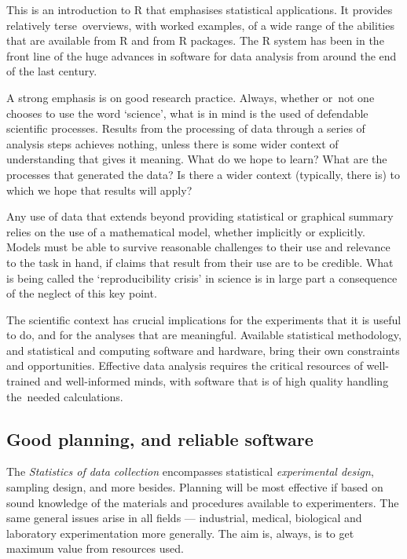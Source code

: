 

\begin{fullwidth}
This is an introduction to R that emphasises statistical applications.
It provides relatively terse overviews, with worked examples, of a
wide range of the abilities that are available from R and from R
packages.  The R system has been in the front line of the huge
advances in software for data analysis from around the end of the
last century.

A strong emphasis is on good research practice.  Always, whether
or not one chooses to use the word `science', what is in mind is
the used of defendable scientific processes.  Results from the
processing of data through a series of analysis steps achieves
nothing, unless there is some wider context of understanding that
gives it meaning.  What do we hope to learn?  What are the processes
that generated the data?  Is there a wider context (typically, there
is) to which we hope that results will apply?

Any use of data that extends beyond providing statistical or
graphical summary relies on the use of a mathematical model,
whether implicitly or explicitly.  Models must be able to
survive reasonable challenges to their use and relevance to
the task in hand, if claims that result from their use are
to be credible.  What is being called the `reproducibility
crisis' in science is in large part a consequence of the neglect
of this key point.

The scientific context has crucial implications for the experiments
that it is useful to do, and for the analyses that are meaningful.
Available statistical methodology, and statistical and computing
software and hardware, bring their own constraints and opportunities.
Effective data analysis requires the critical resources of
well-trained and well-informed minds, with software that is of high 
quality handling the needed calculations.

\subsection*{Good planning, and reliable software}

The \textit{Statistics of data collection}  encompasses statistical
\textit{experimental design}, sampling design, and more besides.
Planning will be most effective if based on sound knowledge of the
materials and procedures available to experimenters.
The same general issues arise in all fields --- industrial, medical, 
biological and laboratory experimentation more generally. The aim 
is, always, is to get maximum value from resources used.


\end{fullwidth}
